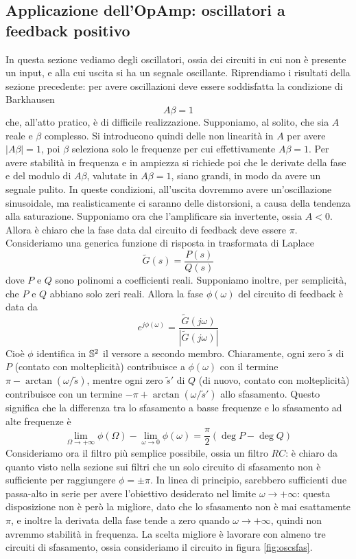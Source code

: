 \documentclass[a4paper, 11pt]{article}
\begin{document}
\subsection{Applicazione dell'OpAmp: oscillatori a feedback positivo}
In questa sezione vediamo degli oscillatori, ossia dei circuiti in cui non è presente un input, e alla cui uscita si ha un segnale oscillante. Riprendiamo i risultati della sezione precedente: per avere oscillazioni deve essere soddisfatta la condizione di Barkhausen
\[A\beta=1\]
che, all'atto pratico, è di difficile realizzazione. Supponiamo, al solito, che sia $A$ reale e $\beta$ complesso. Si introducono quindi delle non linearità in $A$ per avere $|A\beta|=1$, poi $\beta$ seleziona solo le frequenze per cui effettivamente $A\beta=1$. Per avere stabilità in frequenza e in ampiezza si richiede poi che le derivate della fase e del modulo di $A\beta$, valutate in $A\beta=1$, siano grandi, in modo da avere un segnale pulito. In queste condizioni, all'uscita dovremmo avere un'oscillazione sinusoidale, ma realisticamente ci saranno delle distorsioni, a causa della tendenza alla saturazione. Supponiamo ora che l'amplificare sia invertente, ossia $A<0$. Allora è chiaro che la fase data dal circuito di feedback deve essere $\pi$. Consideriamo una generica funzione di risposta in trasformata di Laplace
\[\tilde{G}(s)=\frac{P(s)}{Q(s)}\]
dove $P$ e $Q$ sono polinomi a coefficienti reali. Supponiamo inoltre, per semplicità, che $P$ e $Q$ abbiano solo zeri reali. Allora la fase $\phi(\omega)$ del circuito di feedback è data da
\[e^{j\phi(\omega)}=\frac{\tilde{G}(j\omega)}{|\tilde{G}(j\omega)|}\]
Cioè $\phi$ identifica in $\S^2$ il versore a secondo membro. Chiaramente, ogni zero $\tilde{s}$ di $P$ (contato con molteplicità) contribuisce a $\phi(\omega)$ con il termine $\pi-\arctan(\omega/\tilde{s})$, mentre ogni zero $\tilde{s}'$ di $Q$ (di nuovo, contato con molteplicità) contribuisce con un termine $-\pi+\arctan(\omega/\tilde{s}')$ allo sfasamento. Questo significa che la differenza tra lo sfasamento a basse frequenze e lo sfasamento ad alte frequenze è
\[\lim\limits_{\Omega\to+\infty}\phi(\Omega)-\lim\limits_{\omega\to0}\phi(\omega)=\frac{\pi}{2}\left(\deg P-\deg Q\right)\]
Consideriamo ora il filtro più semplice possibile, ossia un filtro $RC$: è chiaro da quanto visto nella sezione sui filtri che un solo circuito di sfasamento non è sufficiente per raggiungere $\phi=\pm\pi$. In linea di principio, sarebbero sufficienti due passa-alto in serie per avere l'obiettivo desiderato nel limite $\omega\to+\infty$: questa disposizione non è però la migliore, dato che lo sfasamento non è mai esattamente $\pi$, e inoltre la derivata della fase tende a zero quando $\omega\to+\infty$, quindi non avremmo stabilità in frequenza. La scelta migliore è lavorare con almeno tre circuiti di sfasamento, ossia consideriamo il circuito in figura \ref{fig:oscsfas}.
\end{document}
